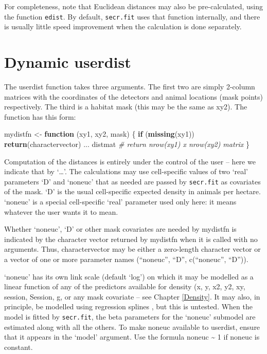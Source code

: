 \documentclass[
]{book}
\newenvironment{Shaded}{\begin{snugshade}}{\end{snugshade}}
\newcommand{\CommentTok}[1]{\textcolor[rgb]{0.56,0.35,0.01}{\textit{#1}}}
\newcommand{\ControlFlowTok}[1]{\textcolor[rgb]{0.13,0.29,0.53}{\textbf{#1}}}
\newcommand{\FunctionTok}[1]{\textcolor[rgb]{0.13,0.29,0.53}{\textbf{#1}}}
\newcommand{\NormalTok}[1]{#1}
\newcommand{\OtherTok}[1]{\textcolor[rgb]{0.56,0.35,0.01}{#1}}
\begin{document}
For completeness, note that Euclidean distances may also be pre-calculated, using the function \texttt{edist}. By default, \texttt{secr.fit} uses that function internally, and there is usually little speed improvement when the calculation is done separately.

\section{Dynamic userdist}\label{dynamic-userdist}


The userdist function takes three arguments. The first two are simply 2-column matrices with the coordinates of the detectors and animal locations (mask points) respectively. The third is a habitat mask (this may be the same as xy2). The function has this form:

\begin{Shaded}
\begin{Highlighting}[]
\NormalTok{mydistfn }\OtherTok{\textless{}{-}} \ControlFlowTok{function}\NormalTok{ (xy1, xy2, mask) \{}
  \ControlFlowTok{if}\NormalTok{ (}\FunctionTok{missing}\NormalTok{(xy1)) }\FunctionTok{return}\NormalTok{(charactervector)  }
\NormalTok{  ...}
\NormalTok{  distmat  }\CommentTok{\# return nrow(xy1) x nrow(xy2) matrix}
\NormalTok{\}}
\end{Highlighting}
\end{Shaded}

Computation of the distances is entirely under the control of the user -- here we indicate that by `\ldots{}'. The calculations may use cell-specific values of two `real' parameters `D' and `noneuc' that as needed are passed by \texttt{secr.fit} as covariates of the mask. `D' is the usual cell-specific expected density in animals per hectare. `noneuc'
is a special cell-specific `real' parameter used only here: it means whatever the user wants it to mean.

Whether `noneuc', `D' or other mask covariates are needed by mydistfn is indicated by the character vector returned by mydistfn when it is called with no arguments. Thus, charactervector may be either a zero-length character vector or a vector of one or more parameter names (``noneuc'', ``D'', c(``noneuc'', ``D'')).

`noneuc' has its own link scale (default `log') on which it may be modelled as a linear function of any of the predictors available for density (x, y, x2, y2, xy, session, Session, g, or any mask covariate -- see Chapter \ref{Density}. It may also, in principle, be modelled using regression splines \citep{bk14}, but this is untested. When the model is fitted by \texttt{secr.fit}, the beta parameters for the `noneuc' submodel are estimated along with all the others. To make noneuc available to userdist, ensure that it appears in the `model' argument. Use the formula noneuc \textasciitilde{} 1 if noneuc is constant.
\end{document}

